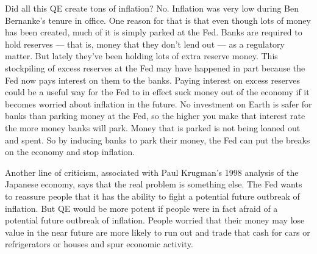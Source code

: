 Did all this QE create tons of inflation? No. Inflation was very low during Ben Bernanke's tenure in office. One reason for that is that even though lots of money has been created, much of it is simply parked at the Fed. Banks are required to hold reserves — that is, money that they don't lend out — as a regulatory matter. But lately they've been holding lots of extra reserve money. This stockpiling of excess reserves at the Fed may have happened in part because the Fed now pays interest on them to the banks. Paying interest on excess reserves could be a useful way for the Fed to in effect suck money out of the economy if it becomes worried about inflation in the future. No investment on Earth is safer for banks than parking money at the Fed, so the higher you make that interest rate the more money banks will park. Money that is parked is not being loaned out and spent. So by inducing banks to park their money, the Fed can put the breaks on the economy and stop inflation. 

Another line of criticism, associated with Paul Krugman's 1998 analysis of the Japanese economy, says that the real problem is something else. The Fed wants to reassure people that it has the ability to fight a potential future outbreak of inflation. But QE would be more potent if people were in fact afraid of a potential future outbreak of inflation. People worried that their money may lose value in the near future are more likely to run out and trade that cash for cars or refrigerators or houses and spur economic activity.